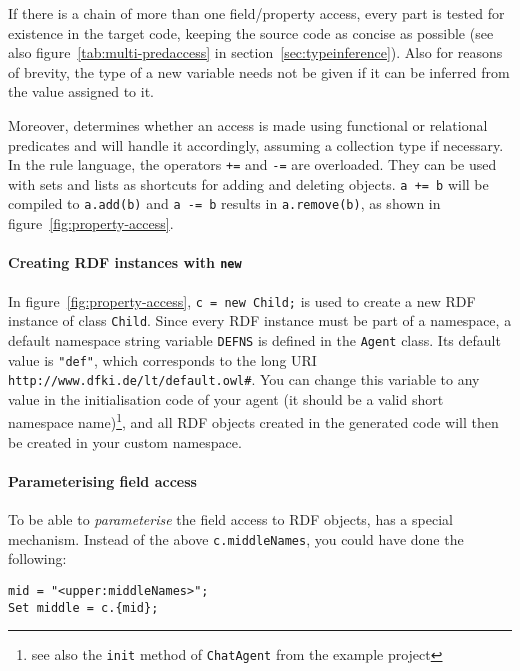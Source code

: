 If there is a chain of more than one field/property access, every part is
tested for existence in the target code, keeping the source code as concise as
possible (see also figure~\ref{tab:multi-predaccess} in
section~\ref{sec:typeinference}). Also for reasons of brevity, the type of a
new variable needs not be given if it can be inferred from the value assigned
to it.

Moreover, \vonda determines whether an access is made using functional or
relational predicates and will handle it accordingly, assuming a collection
type if necessary. In the rule language, the operators \texttt{+=} and
\texttt{-=} are overloaded. They can be used with sets and lists as shortcuts
for adding and deleting objects. \texttt{a += b} will be compiled to
\texttt{a.add(b)} and \texttt{a -= b} results in \texttt{a.remove(b)}, as shown
in figure~\ref{fig:property-access}.

\paragraph{Creating RDF instances with
  \texttt{new}}\label{sec:new_rdf}

In figure~\ref{fig:property-access}, \texttt{c = new Child;} is used
to create a new RDF instance of class \texttt{Child}. Since every RDF
instance must be part of a namespace, a default namespace string
variable \texttt{DEFNS} is defined in the \texttt{Agent} class. Its
default value is \texttt{"def"}, which corresponds to the long URI
\texttt{http://www.dfki.de/lt/default.owl\#}. You can change this
variable to any value in the initialisation code of your agent (it
should be a valid short namespace name)\footnote{see also the
  \texttt{init} method of \texttt{ChatAgent} from the example project},
and all RDF objects created in the generated \vonda code will then be
created in your custom namespace.

\paragraph{Parameterising field access}\label{sec:field_access_expansion}

To be able to \emph{parameterise} the field access to RDF objects,
\vonda has a special mechanism. Instead of the above
\texttt{c.middleNames}, you could have done the following:

\begin{lstlisting}
mid = "<upper:middleNames>";
Set middle = c.{mid};
\end{lstlisting}

